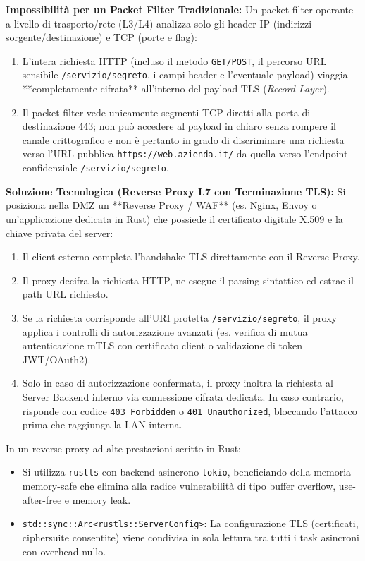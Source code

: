 \documentclass[11pt,a4paper]{article}
\begin{document}
\begin{solutionbox}
\textbf{Impossibilit\`a per un Packet Filter Tradizionale:}
Un packet filter operante a livello di trasporto/rete (L3/L4) analizza solo gli header IP (indirizzi sorgente/destinazione) e TCP (porte e flag):
\begin{enumerate}
    \item L'intera richiesta HTTP (incluso il metodo \texttt{GET/POST}, il percorso URL sensibile \texttt{/servizio/segreto}, i campi header e l'eventuale payload) viaggia **completamente cifrata** all'interno del payload TLS (\textit{Record Layer}).
    \item Il packet filter vede unicamente segmenti TCP diretti alla porta di destinazione 443; non pu\`o accedere al payload in chiaro senza rompere il canale crittografico e non \`e pertanto in grado di discriminare una richiesta verso l'URL pubblica \texttt{https://web.azienda.it/} da quella verso l'endpoint confidenziale \texttt{/servizio/segreto}.
\end{enumerate}

\textbf{Soluzione Tecnologica (Reverse Proxy L7 con Terminazione TLS):}
Si posiziona nella DMZ un **Reverse Proxy / WAF** (es. Nginx, Envoy o un'applicazione dedicata in Rust) che possiede il certificato digitale X.509 e la chiave privata del server:
\begin{enumerate}
    \item Il client esterno completa l'handshake TLS direttamente con il Reverse Proxy.
    \item Il proxy decifra la richiesta HTTP, ne esegue il parsing sintattico ed estrae il path URL richiesto.
    \item Se la richiesta corrisponde all'URI protetta \texttt{/servizio/segreto}, il proxy applica i controlli di autorizzazione avanzati (es. verifica di mutua autenticazione mTLS con certificato client o validazione di token JWT/OAuth2).
    \item Solo in caso di autorizzazione confermata, il proxy inoltra la richiesta al Server Backend interno via connessione cifrata dedicata. In caso contrario, risponde con codice \texttt{403 Forbidden} o \texttt{401 Unauthorized}, bloccando l'attacco prima che raggiunga la LAN interna.
\end{enumerate}
\end{solutionbox}

\begin{altbox}
In un reverse proxy ad alte prestazioni scritto in Rust:
\begin{itemize}
    \item Si utilizza \texttt{rustls} con backend asincrono \texttt{tokio}, beneficiando della memoria memory-safe che elimina alla radice vulnerabilit\`a di tipo buffer overflow, use-after-free e memory leak.
    \item \texttt{std::sync::Arc<rustls::ServerConfig>}: La configurazione TLS (certificati, ciphersuite consentite) viene condivisa in sola lettura tra tutti i task asincroni con overhead nullo.
\end{itemize}
\end{altbox}
\end{document}
